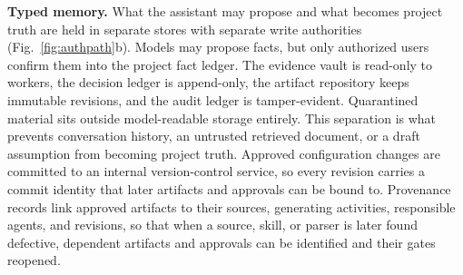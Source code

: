 \documentclass[preprint,5p, 10pt, times]{elsarticle}
\begin{document}
\textbf{Typed memory.}
What the assistant may propose and what becomes project truth are held in separate stores with separate write authorities (Fig.~\ref{fig:authpath}b).
Models may propose facts, but only authorized users confirm them into the project fact ledger. The evidence vault is read-only to workers, the decision ledger is append-only, the artifact repository keeps immutable revisions, and the audit ledger is tamper-evident. Quarantined material sits outside model-readable storage entirely. This separation is what prevents conversation history, an untrusted retrieved document, or a draft assumption from becoming project truth.
%
Approved configuration changes are committed to an internal version-control service, so every revision carries a commit identity that later artifacts and approvals can be bound to. 
Provenance records link approved artifacts to their sources, generating activities, responsible agents, and revisions, so that when a source, skill, or parser is later found defective, dependent artifacts and approvals can be identified and their gates reopened.
%
\end{document}
